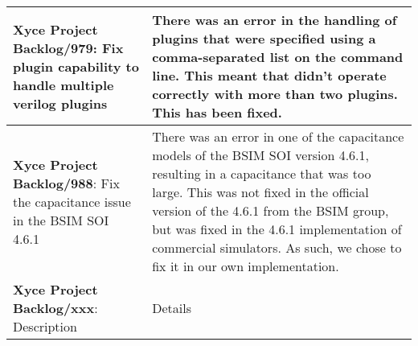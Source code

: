 {\begin{longtable}[h] {>{\raggedright\small}m{2in}|>{\raggedright\let\\\tabularnewline\small}m{3.5in}}
  \textbf{Xyce Project Backlog/979}: Fix plugin capability to handle multiple verilog plugins & There was an error in the handling of plugins that were specified using a comma-separated list on the command line.  This meant that \Xyce{} didn't operate correctly with more than two plugins.  This has been fixed.
  \\\hline
  
  \textbf{Xyce Project Backlog/988}: Fix the capacitance issue in the BSIM SOI 4.6.1 &  There was an error in one of the capacitance models of the BSIM SOI version 4.6.1, resulting in a capacitance that was too large.  This was not fixed in the official version of the 4.6.1 from the BSIM group, but was fixed in the 4.6.1 implementation of commercial simulators.  As such, we chose to fix it in our own implementation. 
  \\\hline

\textbf{Xyce Project Backlog/xxx}: Description
  &  Details
  \\\hline


\end{longtable}
}
